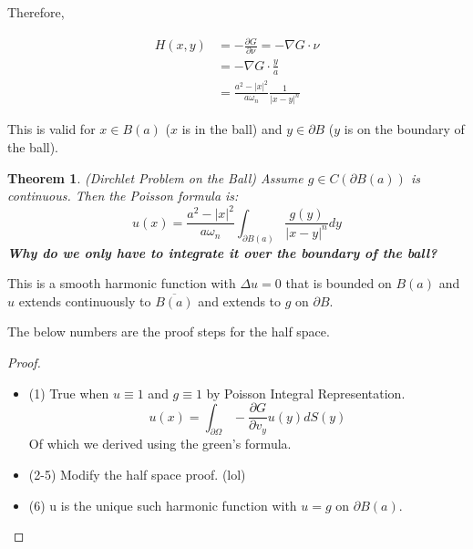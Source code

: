 \documentclass{article}
\newtheorem{theorem}{Theorem}[section]
\newtheorem{one minute paper}[theorem]{One Minute Paper}
\begin{document}
Therefore, 

\begin{align}
    H(x,y) &= -\frac{\partial G}{\partial \nu} = -\nabla G \cdot \nu \\
    &= -\nabla G \cdot \frac{y}{a}\\
    &= \frac{a^2 - |x|^2}{a \omega_n}\frac{1}{|x-y|^n}
\end{align}

This is valid for $x \in B(a)$ ($x$ is in the ball) and $ y \in \partial B$ ($y$ is on the boundary of the ball). 

\begin{theorem}
    (Dirchlet Problem on the Ball) Assume $g \in C(\partial B(a))$ is continuous. Then the Poisson formula is:
    \begin{equation}
        u(x) = \frac{a^2 - |x|^2}{a \omega_n}\int_{\partial B(a)}\frac{g(y)}{|x-y|^n}dy
    \end{equation}
    \textbf{Why do we only have to integrate it over the boundary of the ball?}
\end{theorem}

This is a smooth harmonic function with $\Delta u = 0$ that is bounded on $B(a)$ and $u$ extends continuously to $\overline{B(a)}$ and extends to $g$ on $\partial B$. 

The below numbers are the proof steps for the half space.

\begin{proof}
    \begin{itemize}
        \item (1) True when $u\equiv 1$ and $g \equiv 1$ by Poisson Integral Representation. 
        \begin{equation}
            u(x) = \int_{\partial \Omega} -\frac{\partial G}{\partial v_y}u(y)dS(y) 
        \end{equation}
        Of which we derived using the green's formula.
        \item (2-5) Modify the half space proof. (lol) 
        \item (6) u is the unique such harmonic function with $u = g$ on $\partial B(a)$.   
    \end{itemize}
\end{proof}
\end{document}
